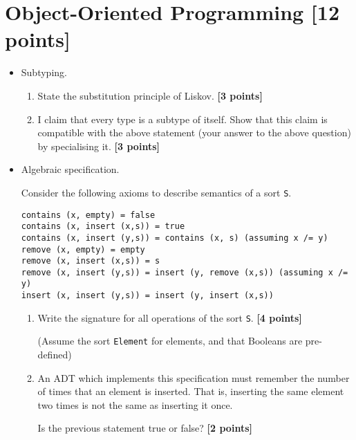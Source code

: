\documentclass{article}
\begin{document}
\newpage
\section{Object-Oriented Programming [12 points]}

\begin{itemize}

\item Subtyping.

\begin{enumerate}
\item State the substitution principle of Liskov. \hfill{\textbf{[3 points]}}

\item I claim that every type is a subtype of itself. Show that this claim is compatible with 
  the above statement (your answer to the above question) by specialising it. \hfill{\textbf{[3 points]}}
\end{enumerate}

\item Algebraic specification.

Consider the following axioms to describe semantics of a sort
\verb!S!.

\begin{verbatim}
contains (x, empty) = false
contains (x, insert (x,s)) = true
contains (x, insert (y,s)) = contains (x, s) (assuming x /= y)
remove (x, empty) = empty
remove (x, insert (x,s)) = s
remove (x, insert (y,s)) = insert (y, remove (x,s)) (assuming x /= y)
insert (x, insert (y,s)) = insert (y, insert (x,s))
\end{verbatim}

\begin{enumerate}
\item 
Write the signature for all operations of the sort \verb!S!. \hfill{\textbf{[4 points]}}

(Assume the sort \verb!Element! for elements, and that Booleans are
pre-defined) 

\item An ADT which implements this specification must remember the
  number of times that an element is inserted. That is, inserting the same
  element two times is not the same as inserting it once.

Is the previous statement true or false? \hfill{\textbf{[2 points]}}

\end{enumerate}


\end{itemize}


\newpage
\end{document}
